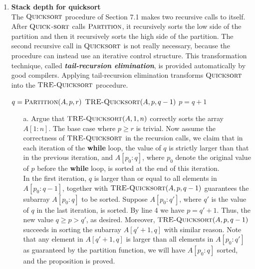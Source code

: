 \documentclass[12pt,reqno]{amsart}
\newif\ifanswer
\begin{document}
\begin{enumerate}[1.]
\item \textbf{Stack depth for quicksort}\\ The $\textsc{Quicksort}$ procedure of Section 7.1 makes two recursive calls to itself. After $\textsc{Quick}$-$\textsc{sort}$ calls $\textsc{Partition}$, it recursively sorts the low side of the partition and then it recursively sorts the high side of the partition. The second recursive call in $\textsc{Quicksort}$ is not really necessary, because the procedure can instead use an iterative control structure. This transformation technique, called \textit{\textbf{tail-recursion elimination}}, is provided automatically by good compilers. Applying tail-recursion elimination transforms $\textsc{Quicksort}$ into the $\textsc{TRE-Quicksort}$ procedure.
\begin{algorithm}
    \caption{$\textsc{TRE-Quicksort}(A, p, r)$}
    \begin{algorithmic}[1]
            \STATE $q = \textsc{Partition}(A, p, r)$
            \STATE $\textsc{TRE-Quicksort}(A, p, q - 1)$
            \STATE $p = q + 1$
        \ENDWHILE
    \end{algorithmic}
\end{algorithm}
\begin{enumerate}
    \item[a.] Argue that $\textsc{TRE-Quicksort}(A, 1, n)$ correctly sorts the array $A[1: n]$.
    \ifanswer
    \noindent {\bf \\Solution}
    The base case where $p \geq r$ is trivial. Now assume the correctness of $\textsc{TRE-Quicksort}$ in the recursion calls, we claim that in each iteration of the \textbf{while} loop, the value of $q$ is strictly larger than that in the previous iteration, and $A[p_0: q]$, where $p_0$ denote the original value of $p$ before the \textbf{while} loop, is sorted at the end of this iteration.\\
    In the first iteration, $q$ is larger than or equal to all elements in $A[p_0: q - 1]$, together with $\textsc{TRE-Quicksort}(A, p, q - 1)$ guarantees the subarray $A[p_0: q]$ to be sorted. Suppose $A[p_0: q']$, where $q'$ is the value of $q$ in the last iteration, is sorted. By line 4 we have $p = q' + 1$. Thus, the new value $q \geq p > q'$, as desired. Moreover, $\textsc{TRE-Quicksort}(A, p, q - 1)$ succeeds in sorting the subarray $A[q' + 1, q]$ with similar reason. Note that any element in $A[q' + 1, q]$ is larger than all elements in $A[p_0: q']$ as guaranteed by the partition function, we will have $A[p_0: q]$ sorted, and the proposition is proved.\\

\end{enumerate}
\end{enumerate}
\end{document}
